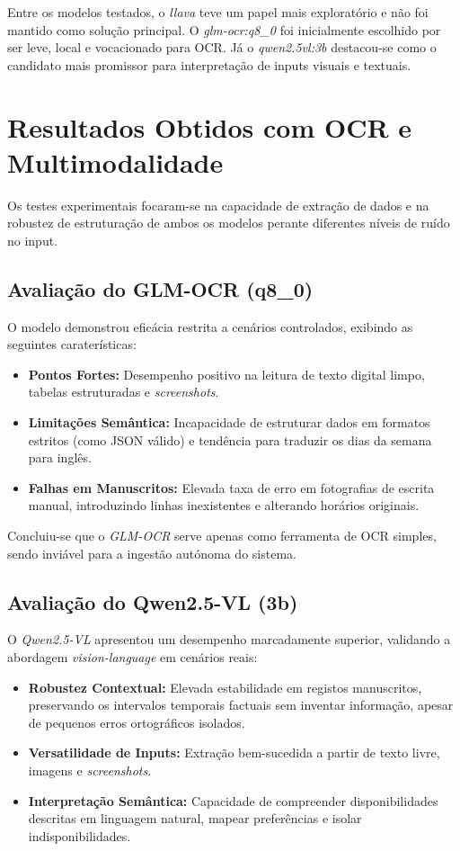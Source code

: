 Entre os modelos testados, o \textit{llava} teve um papel mais exploratório e não foi mantido como solução principal.
O \textit{glm-ocr:q8\_0} foi inicialmente escolhido por ser leve, local e vocacionado para OCR.
Já o \textit{qwen2.5vl:3b} destacou-se como o candidato mais promissor para interpretação de inputs visuais e textuais.

\section{Resultados Obtidos com OCR e Multimodalidade}

Os testes experimentais focaram-se na capacidade de extração de dados e na robustez de estruturação de ambos os modelos perante diferentes níveis de ruído no input.

\subsection{Avaliação do GLM-OCR (q8\_0)}

O modelo demonstrou eficácia restrita a cenários controlados, exibindo as seguintes caraterísticas:

\begin{itemize}
    \item \textbf{Pontos Fortes:} Desempenho positivo na leitura de texto digital limpo, tabelas estruturadas e \textit{screenshots}.
    \item \textbf{Limitações Semântica:} Incapacidade de estruturar dados em formatos estritos (como JSON válido) e tendência para traduzir os dias da semana para inglês.
    \item \textbf{Falhas em Manuscritos:} Elevada taxa de erro em fotografias de escrita manual, introduzindo linhas inexistentes e alterando horários originais.
\end{itemize}

Concluiu-se que o \textit{GLM-OCR} serve apenas como ferramenta de OCR simples, sendo inviável para a ingestão autónoma do sistema.

\subsection{Avaliação do Qwen2.5-VL (3b)}

O \textit{Qwen2.5-VL} apresentou um desempenho marcadamente superior, validando a abordagem \textit{vision-language} em cenários reais:

\begin{itemize}
    \item \textbf{Robustez Contextual:} Elevada estabilidade em registos manuscritos, preservando os intervalos temporais factuais sem inventar informação, apesar de pequenos erros ortográficos isolados.
    \item \textbf{Versatilidade de Inputs:} Extração bem-sucedida a partir de texto livre, imagens e \textit{screenshots}.
    \item \textbf{Interpretação Semântica:} Capacidade de compreender disponibilidades descritas em linguagem natural, mapear preferências e isolar indisponibilidades.
\end{itemize}

